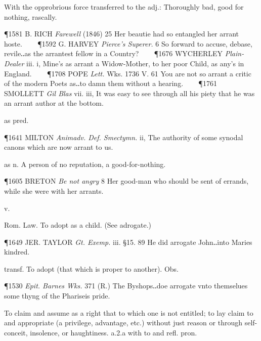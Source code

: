 \begin{description}[wide, labelwidth=!, labelindent=0pt]
\begin{myenumerate}
 With the opprobrious force transferred to the adj.: Thoroughly bad, good for nothing, rascally.

\P 1581 B. RICH  \textit{Farewell} (1846) 25 Her beautie had so entangled her arrant hoste.    
\P 1592 G. HARVEY  \textit{Pierce's Superer.} 6 So forward to accuse, debase, revile‥as the arrantest fellow in a Country?    
\P 1676 WYCHERLEY  \textit{Plain-Dealer} iii. i, Mine's as arrant a Widow-Mother, to her poor Child, as any's in England.    
\P 1708 POPE \textit{Lett.} Wks. 1736 V. 61 You are not so arrant a critic of the modern Poets as‥to damn them without a hearing.    
\P 1761 SMOLLETT  \textit{Gil Blas} vii. iii, It was easy to see through all his piety that he was an arrant author at the bottom.

 as pred.

\P 1641 MILTON  \textit{Animadv. Def. Smectymn.} ii, The authority of some synodal canons which are now arrant to us.

 as n. A person of no reputation, a good-for-nothing.

\P 1605 BRETON  \textit{Be not angry} 8 Her good-man who should be sent of errands, while she were with her arrants.
\end{myenumerate}


 v.

\noindent {}

\vspace{-0.3cm}

\begin{myenumerate}

 Rom. Law. To adopt as a child. (See adrogate.)

\P 1649 JER. TAYLOR  \textit{Gt. Exemp.} iii. §15. 89 He did arrogate John‥into Maries kindred.

 transf. To adopt (that which is proper to another). Obs.

\P 1530 \textit{Epit. Barnes Wks.} 371 (R.) The Byshops‥doe arrogate vnto themselues some thyng of the Phariseis pride.

 To claim and assume as a right that to which one is not entitled; to lay claim to and appropriate (a privilege, advantage, etc.) without just reason or through self-conceit, insolence, or haughtiness. a.2.a with to and refl. pron.


\end{myenumerate}
\end{description}
